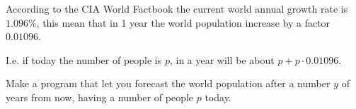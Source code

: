 



\ExamNameLine
\ExamStandardBoxEn
According to the CIA World Factbook the current world annual growth
rate is $1.096\%$, this mean that in 1 year the world population
increase by a factor $0.01096$.

I.e. if today the number of people is $p$, in a year will be about
$p+p\cdot 0.01096$.

Make a program that let you forecast the world population after a
number $y$ of years from now, having a number of people $p$ today.



